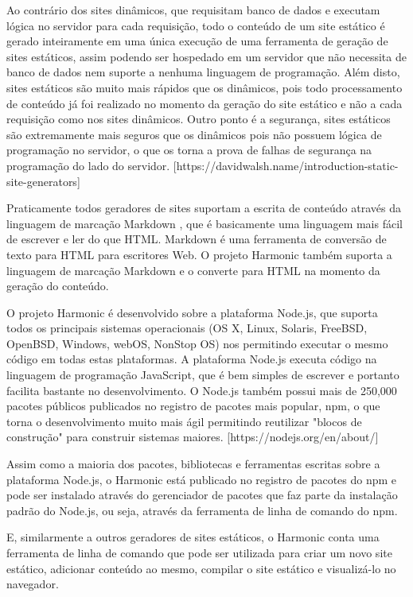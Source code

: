 \documentclass[ppginf, pep]{esinucpel}
\begin{document}
Ao contrário dos sites dinâmicos, que requisitam banco de dados e executam lógica no servidor para cada requisição, todo o conteúdo de um site estático é gerado inteiramente em uma única execução de uma ferramenta de geração de sites estáticos, assim podendo ser hospedado em um servidor que não necessita de banco de dados nem suporte a nenhuma linguagem de programação. Além disto, sites estáticos são muito mais rápidos que os dinâmicos, pois todo processamento de conteúdo já foi realizado no momento da geração do site estático e não a cada requisição como nos sites dinâmicos. Outro ponto é a segurança, sites estáticos são extremamente mais seguros que os dinâmicos pois não possuem lógica de programação no servidor, o que os torna a prova de falhas de segurança na programação do lado do servidor. [https://davidwalsh.name/introduction-static-site-generators]

Praticamente todos geradores de sites suportam a escrita de conteúdo através da linguagem de marcação Markdown \cite{markdown}, que é basicamente uma linguagem mais fácil de escrever e ler do que HTML. Markdown é uma ferramenta de conversão de texto para HTML para escritores Web. O projeto Harmonic também suporta a linguagem de marcação Markdown e o converte para HTML na momento da geração do conteúdo.

O projeto Harmonic é desenvolvido sobre a plataforma Node.js, que suporta todos os principais sistemas operacionais (OS X, Linux, Solaris, FreeBSD, OpenBSD, Windows, webOS, NonStop OS) nos permitindo executar o mesmo código em todas estas plataformas. A plataforma Node.js executa código na linguagem de programação JavaScript, que é bem simples de escrever e portanto facilita bastante no desenvolvimento. O Node.js também possui mais de 250,000 pacotes públicos publicados no registro de pacotes mais popular, npm, o que torna o desenvolvimento muito mais ágil permitindo reutilizar "blocos de construção" para construir sistemas maiores. [https://nodejs.org/en/about/] %

Assim como a maioria dos pacotes, bibliotecas e ferramentas escritas sobre a plataforma Node.js, o Harmonic está publicado no registro de pacotes do npm e pode ser instalado através do gerenciador de pacotes que faz parte da instalação padrão do Node.js, ou seja, através da ferramenta de linha de comando do npm.

E, similarmente a outros geradores de sites estáticos, o Harmonic conta uma ferramenta de linha de comando que pode ser utilizada para criar um novo site estático, adicionar conteúdo ao mesmo, compilar o site estático e visualizá-lo no navegador.
\end{document}
